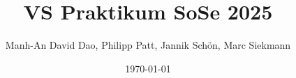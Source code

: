 \subject{Verteilte Systeme}
\title{VS Praktikum SoSe 2025}
\author{Manh-An David Dao, Philipp Patt, Jannik Schön, Marc Siekmann}
\date{\today}

\maketitle
